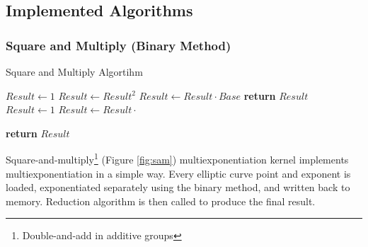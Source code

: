 \subsection{Implemented Algorithms}


\subsubsection{Square and Multiply (Binary Method)}

\begin{algorithm}[h]
    \caption{Square and Multiply Algortihm }\label{fig:sam}
    \begin{algorithmic}[1]
    
        \State $Result \gets 1$
            \State $Result \gets Result^2$
                \State $Result \gets Result \cdot Base$
            \EndIf
        \EndFor
        \State \textbf{return} $Result$
    \EndFunction
    \\
        \State $Result \gets 1$
            \State $Result \gets Result \cdot $
        \EndFor
    
        \State \textbf{return} $Result$
        
    \EndFunction
    \end{algorithmic}
\end{algorithm}
Square-and-multiply\footnote{Double-and-add in additive groups} \cite{knuth2014art} (Figure \ref{fig:sam}) multiexponentiation kernel implements multiexponentiation in a simple way. Every elliptic curve point and exponent is loaded, exponentiated separately using the binary method, and written back to memory. Reduction algorithm is then called to produce the final result.
